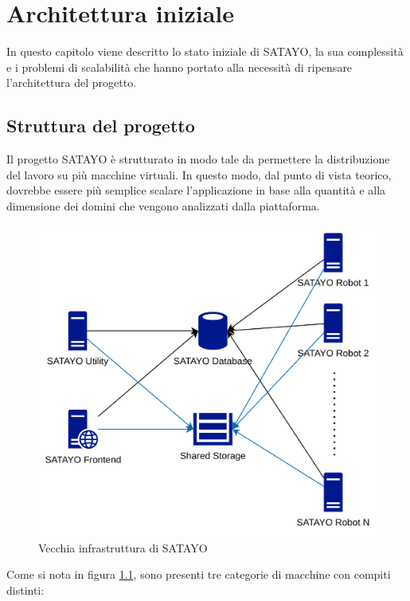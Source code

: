 \chapter{Architettura iniziale}
\label{cha:architettura_iniziale}

In questo capitolo viene descritto lo stato iniziale di SATAYO, la sua complessità
e i problemi di scalabilità che hanno portato alla necessità di ripensare l'architettura
del progetto.

\section{Struttura del progetto}
\label{sec:struttura}

Il progetto SATAYO è strutturato in modo tale da permettere la distribuzione del
lavoro su più macchine virtuali. In questo modo, dal punto di vista teorico, dovrebbe
essere più semplice scalare l'applicazione in base alla quantità e alla dimensione
dei domini che vengono analizzati dalla piattaforma.

\begin{figure}[htbp]
  \centering
  \includegraphics[width=.6\linewidth]{images/SATAYO_infrastructure_old.png}
  \caption{Vecchia infrastruttura di SATAYO}
  \label{fig:infra_old}
\end{figure}

Come si nota in figura \ref{fig:infra_old}, sono presenti tre categorie di macchine
con compiti distinti:

